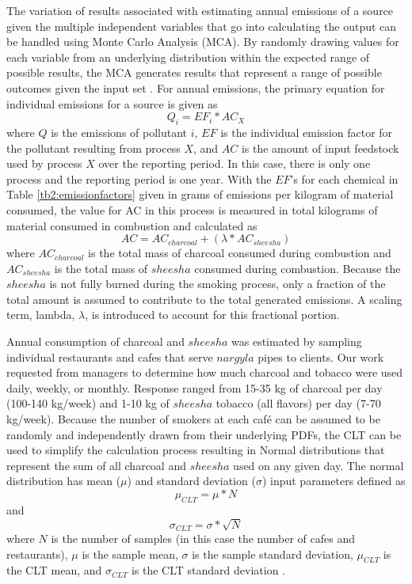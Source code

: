 The variation of results associated with estimating annual emissions of a source given the multiple independent variables that go into calculating the output can be handled using Monte Carlo Analysis (MCA).  By randomly drawing values for each variable from an underlying distribution within the expected range of possible results, the MCA generates results that represent a range of possible outcomes given the input set \citep{Johnson2011}.  For annual emissions, the primary equation for individual emissions for a source is given as
%
\begin{equation}
\label{eq1}
Q_{i} = EF_{i} * AC_{X}
\end{equation}
%
\noindent
where $Q$ is the emissions of pollutant $i$, $EF$ is the individual emission factor for the pollutant resulting from process $X$, and $AC$ is the amount of input feedstock used by process $X$ over the reporting period.  In this case, there is only one process and the reporting period is one year.  With the $EF$’s for each chemical in Table \ref{tb2:emissionfactors} given in grams of emissions per kilogram of material consumed, the value for AC in this process is measured in total kilograms of material consumed in combustion and calculated as
%
\begin{equation}
\label{eq2}
AC = AC_{charcoal} + ( \lambda * AC_{sheesha} )
\end{equation}
%
\noindent
where $AC_{charcoal}$ is the total mass of charcoal consumed during combustion and $AC_{sheesha}$ is the total mass of $sheesha$ consumed during combustion.  Because the $sheesha$ is not fully burned during the smoking process, only a fraction of the total amount is assumed to contribute to the total generated emissions.  A scaling term, lambda, $\lambda$, is introduced to account for this fractional portion. 

Annual consumption of charcoal and $sheesha$ was estimated by sampling individual restaurants and cafes that serve $nargyla$ pipes to clients.  Our work requested from managers to determine how much charcoal and tobacco were used daily, weekly, or monthly.  Response ranged from 15-35 kg of charcoal per day (100-140 kg/week) and 1-10 kg of $sheesha$ tobacco (all flavors) per day (7-70 kg/week).  Because the number of smokers at each café can be assumed to be randomly and independently drawn from their underlying PDFs, the CLT can be used to simplify the calculation process resulting in Normal distributions that represent the sum of all charcoal and $sheesha$ used on any given day.  The normal distribution has mean ($\mu$) and standard deviation ($\sigma$) input parameters defined as
%
\begin{equation}
\label{eq3}
\mu_{CLT}= \mu*N
\end{equation}
%
\noindent
and 
%
\begin{equation}
\label{eq4}
\sigma_{CLT}= \sigma*\sqrt{N}
\end{equation}
%
\noindent
where $N$ is the number of samples (in this case the number of cafes and restaurants), $\mu$ is the sample mean, $\sigma$ is the sample standard deviation, $\mu_{CLT}$ is the CLT mean, and $\sigma_{CLT}$ is the CLT standard deviation \citep{Ott1981}. 

